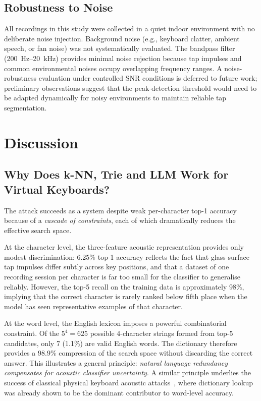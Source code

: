\documentclass[conference]{IEEEtran}
\begin{document}
\subsection{Robustness to Noise}

All recordings in this study were collected in a quiet indoor
environment with no deliberate noise injection.
Background noise (e.g., keyboard clatter, ambient speech, or fan noise) was not systematically evaluated. The bandpass filter (200~Hz--20~kHz) provides minimal noise rejection because tap impulses and common environmental noises occupy overlapping frequency ranges. A noise-robustness evaluation under controlled SNR conditions is deferred to future work; preliminary observations suggest that the peak-detection threshold would need to be adapted dynamically for noisy environments to maintain reliable tap segmentation.

\section{Discussion}
\label{sec:discussion}

\subsection{Why Does k-NN, Trie and LLM Work for Virtual Keyboards?}

The attack succeeds as a system despite weak per-character top-1
accuracy because of a \emph{cascade of constraints}, each of which
dramatically reduces the effective search space.

At the character level, the three-feature acoustic representation
provides only modest discrimination: 6.25\% top-1 accuracy reflects
the fact that glass-surface tap impulses differ subtly across key
positions, and that a dataset of one recording session per character
is far too small for the classifier to generalise reliably.
However, the top-5 recall on the training data is approximately
98\%, implying that the correct character is rarely ranked below
fifth place when the model has seen representative examples of that
character.

At the word level, the English lexicon imposes a powerful
combinatorial constraint.
Of the $5^4 = 625$ possible 4-character strings formed from top-5
candidates, only 7 (1.1\%) are valid English words.
The dictionary therefore provides a 98.9\% compression of the
search space without discarding the correct answer.
This illustrates a general principle: \emph{natural language
redundancy compensates for acoustic classifier uncertainty}.
A similar principle underlies the success of classical physical
keyboard acoustic attacks~\cite{zhuang2005}, where dictionary
lookup was already shown to be the dominant contributor to
word-level accuracy.
\end{document}
